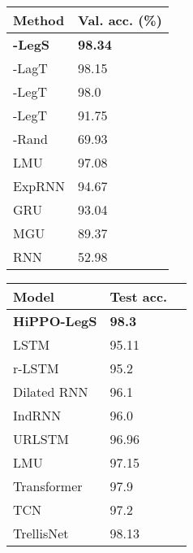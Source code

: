 \documentclass{article}
\begin{document}
\begin{minipage}{.58\linewidth}
    \small
        \centering
        \begin{tabular}{@{}ll@{}}
            \toprule
            Method                     & Val. acc. (\%) \\
            \midrule
            \textbf{-LegS}        & \textbf{98.34}           \\
            -LagT            & 98.15                    \\
            -LegT   & 98.0                     \\
            -LegT    & 91.75                    \\
            -Rand                 & 69.93 \\
            \midrule
            LMU                        & 97.08                    \\
            ExpRNN                     & 94.67                    \\
            GRU                        & 93.04                    \\
            MGU                        & 89.37                    \\
            RNN                        & 52.98                    \\
            \bottomrule
        \end{tabular}\hfill
        \begin{tabular}{@{}lll@{}}
            \toprule
            Model                                    & Test acc.        \\
            \midrule
            \textbf{HiPPO-LegS}                                & \textbf{98.3} \\
            \midrule
            LSTM~\citep{gu2020improving}              & 95.11         \\
            r-LSTM~\citep{trinh2018learning}         & 95.2          \\
            Dilated RNN~\citep{chang2017dilated}      & 96.1          \\
            IndRNN~\citep{indrnn}                     & 96.0          \\
            URLSTM~\citep{gu2020improving}            & 96.96         \\
            LMU~\citep{voelker2019legendre}           & 97.15         \\
            \midrule
            Transformer~\citep{trinh2018learning}     & 97.9          \\
            TCN~\citep{bai2018empirical} & 97.2          \\
            TrellisNet~\citep{trellisnet}             & 98.13         \\
            \bottomrule
        \end{tabular}
    \label{tab:pmnist}
\end{minipage}
\end{document}
